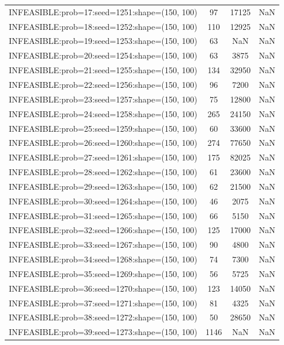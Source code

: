 \begin{longtable}{lccc}
INFEASIBLE:prob=17:seed=1251:shape=(150, 100)  &    97 & 17125 &    NaN \\
INFEASIBLE:prob=18:seed=1252:shape=(150, 100)  &   110 & 12925 &    NaN \\
INFEASIBLE:prob=19:seed=1253:shape=(150, 100)  &    63 &   NaN &    NaN \\
INFEASIBLE:prob=20:seed=1254:shape=(150, 100)  &    63 &  3875 &    NaN \\
INFEASIBLE:prob=21:seed=1255:shape=(150, 100)  &   134 & 32950 &    NaN \\
INFEASIBLE:prob=22:seed=1256:shape=(150, 100)  &    96 &  7200 &    NaN \\
INFEASIBLE:prob=23:seed=1257:shape=(150, 100)  &    75 & 12800 &    NaN \\
INFEASIBLE:prob=24:seed=1258:shape=(150, 100)  &   265 & 24150 &    NaN \\
INFEASIBLE:prob=25:seed=1259:shape=(150, 100)  &    60 & 33600 &    NaN \\
INFEASIBLE:prob=26:seed=1260:shape=(150, 100)  &   274 & 77650 &    NaN \\
INFEASIBLE:prob=27:seed=1261:shape=(150, 100)  &   175 & 82025 &    NaN \\
INFEASIBLE:prob=28:seed=1262:shape=(150, 100)  &    61 & 23600 &    NaN \\
INFEASIBLE:prob=29:seed=1263:shape=(150, 100)  &    62 & 21500 &    NaN \\
INFEASIBLE:prob=30:seed=1264:shape=(150, 100)  &    46 &  2075 &    NaN \\
INFEASIBLE:prob=31:seed=1265:shape=(150, 100)  &    66 &  5150 &    NaN \\
INFEASIBLE:prob=32:seed=1266:shape=(150, 100)  &   125 & 17000 &    NaN \\
INFEASIBLE:prob=33:seed=1267:shape=(150, 100)  &    90 &  4800 &    NaN \\
INFEASIBLE:prob=34:seed=1268:shape=(150, 100)  &    74 &  7300 &    NaN \\
INFEASIBLE:prob=35:seed=1269:shape=(150, 100)  &    56 &  5725 &    NaN \\
INFEASIBLE:prob=36:seed=1270:shape=(150, 100)  &   123 & 14050 &    NaN \\
INFEASIBLE:prob=37:seed=1271:shape=(150, 100)  &    81 &  4325 &    NaN \\
INFEASIBLE:prob=38:seed=1272:shape=(150, 100)  &    50 & 28650 &    NaN \\
INFEASIBLE:prob=39:seed=1273:shape=(150, 100)  &  1146 &   NaN &    NaN \\

\end{longtable}
